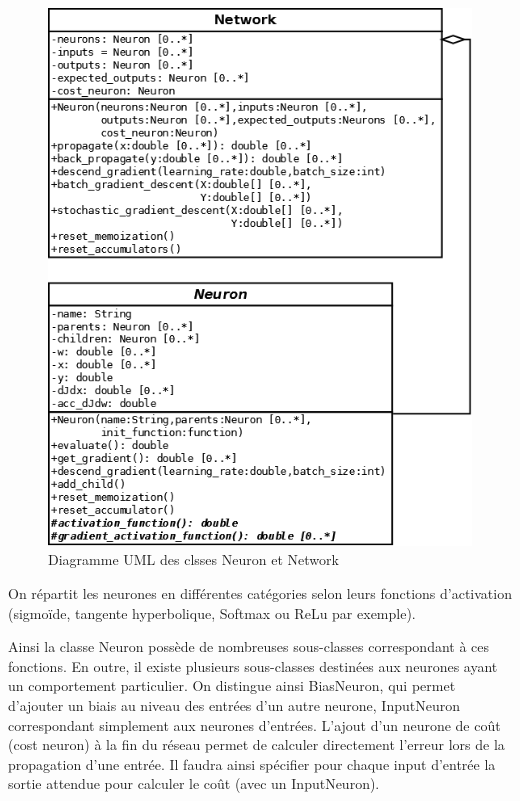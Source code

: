 \documentclass{report}
\theoremstyle{plain}
\theoremstyle{definition}
\theoremstyle{remark}
\begin{document}
\begin{figure}
\begin{center}
\includegraphics[scale=0.3]{images/uml_simplifie_maispastrop_imp1.png}
\caption{Diagramme UML des clsses Neuron et Network}
\label{Diagramme UML des classes Neuron et Network}
\end{center}
\end{figure}

On répartit les neurones en différentes catégories selon leurs fonctions d'activation (sigmoïde, tangente hyperbolique, Softmax ou ReLu par exemple).

Ainsi la classe Neuron possède de nombreuses sous-classes correspondant à ces fonctions. En outre, il existe plusieurs sous-classes destinées aux neurones ayant un comportement particulier. On distingue ainsi BiasNeuron, qui permet d'ajouter un biais au niveau des entrées d'un autre neurone, InputNeuron correspondant simplement aux neurones d'entrées. L'ajout d'un neurone de coût (cost neuron) à la fin du réseau permet de calculer directement l'erreur lors de la propagation d'une entrée. Il faudra ainsi spécifier pour chaque input d'entrée la sortie attendue pour calculer le coût (avec un InputNeuron).
\end{document}
